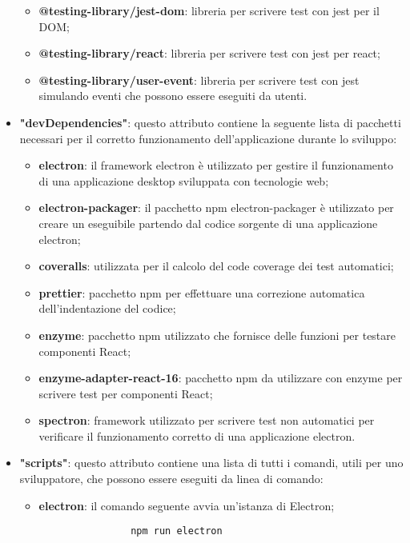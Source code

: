 \begin{itemize}
\begin{itemize}
            \item \textbf{@testing-library/jest-dom}: libreria per scrivere test con jest per il DOM;
            \item \textbf{@testing-library/react}: libreria per scrivere test con jest per react;
            \item \textbf{@testing-library/user-event}: libreria per scrivere test con jest simulando eventi che possono essere eseguiti da utenti.
        \end{itemize}
    \item \textbf{"devDependencies"}: questo attributo contiene la seguente lista di pacchetti necessari per il corretto funzionamento dell'applicazione durante lo sviluppo:
        \begin{itemize}
            \item \textbf{electron}: il framework electron è utilizzato per gestire il funzionamento di una applicazione desktop sviluppata con tecnologie web;
            \item \textbf{electron-packager}: il pacchetto npm electron-packager è utilizzato per creare un eseguibile partendo dal codice sorgente di una applicazione electron;
            \item \textbf{coveralls}: utilizzata per il calcolo del code coverage dei test automatici;
            \item \textbf{prettier}: pacchetto npm per effettuare una correzione automatica dell'indentazione del codice;
            \item \textbf{enzyme}: pacchetto npm utilizzato che fornisce delle funzioni per testare componenti React;
            \item \textbf{enzyme-adapter-react-16}: pacchetto npm da utilizzare con enzyme per scrivere test per componenti React;
            \item \textbf{spectron}: framework utilizzato per scrivere test non automatici per verificare il funzionamento corretto di una applicazione electron.
        \end{itemize} 
    \item \textbf{"scripts"}: questo attributo contiene una lista di tutti i comandi, utili per uno sviluppatore, che possono essere eseguiti da linea di comando:
        \begin{itemize}
            \item \textbf{electron}: il comando seguente avvia un'istanza di Electron;
            \begin{verbatim}
            	npm run electron

\end{verbatim}
\end{itemize}
\end{itemize}
